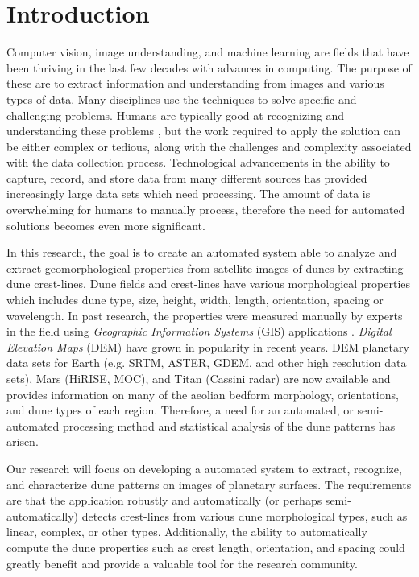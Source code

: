 \section{Introduction}

Computer vision, image understanding, and machine learning are fields that have been thriving in the last few decades with advances in computing. The purpose of these are to extract information and understanding from images and various types of data. Many disciplines use the techniques to solve specific and challenging problems. Humans are typically good at recognizing and understanding these problems \cite{statistical-pattern-recognition}, but the work required to apply the solution can be either complex or tedious, along with the challenges and complexity associated with the data collection process. Technological advancements in the ability to capture, record, and store data from many different sources has provided increasingly large data sets which need processing. The amount of data is overwhelming for humans to manually process, therefore the need for automated solutions becomes even more significant.

In this research, the goal is to create an automated system able to analyze and extract geomorphological properties from satellite images of dunes by extracting dune crest-lines. Dune fields and crest-lines have various morphological properties which includes dune type, size, height, width, length, orientation, spacing or wavelength. In past research, the properties were measured manually by experts in the field using \emph{Geographic Information Systems} (GIS) applications \cite{ewing-kocurek-lake-2006,ewing-peyret-kocurek-bourke-2010,fenton-michaels-beyer-2014,fenton-michaels-chojnacki-beyer-2014,kocurek-ewing-2005}. \emph{Digital Elevation Maps} (DEM) have grown in popularity in recent years. DEM planetary data sets for Earth (e.g. SRTM, ASTER, GDEM, and other high resolution data sets), Mars (HiRISE, MOC), and Titan (Cassini radar) are now available and provides information on many of the aeolian bedform morphology, orientations, and dune types of each region. Therefore, a need for an automated, or semi-automated processing method and statistical analysis of the dune patterns has arisen.

Our research will focus on developing a automated system to extract, recognize, and characterize dune patterns on images of planetary surfaces. The requirements are that the application robustly and automatically (or perhaps semi-automatically) detects crest-lines from various dune morphological types, such as linear, complex, or other types. Additionally, the ability to automatically compute the dune properties such as crest length, orientation, and spacing could greatly benefit and provide a valuable tool for the research community.

